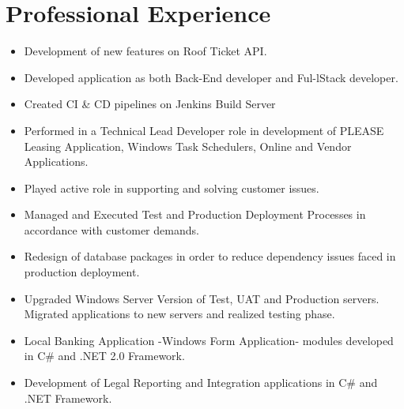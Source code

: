 \documentclass[1pt,a4paper,verdana]{moderncv} %
\begin{document}
\section{Professional Experience}
	{\begin{itemize}
		\item Development of new features on Roof Ticket API.
\end{itemize}}
	{\begin{itemize}
			\item Developed application as both Back-End developer and Ful-lStack developer. 
			\item Created CI \& CD pipelines on  Jenkins Build Server
\end{itemize}}
	{
		\begin{itemize}
		\item Performed in a Technical Lead Developer role in development of PLEASE Leasing Application, Windows Task Schedulers, Online and Vendor Applications.
		\item Played active role in supporting and solving customer issues.
		\item Managed and Executed Test and Production Deployment Processes in accordance with customer demands.
		\item Redesign of database packages in order to reduce dependency issues faced in production deployment.		
		\item Upgraded Windows Server Version of Test, UAT and Production servers. Migrated applications to new servers and realized testing phase.
\end{itemize}}		
	{
		\begin{itemize}
		\item Local Banking Application -Windows Form Application- modules developed in C\# and .NET 2.0 Framework. 
		\item Development of Legal Reporting and Integration applications in C\# and .NET Framework.
\end{itemize}}
\end{document}
